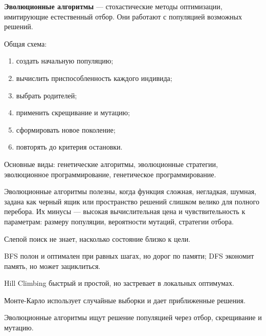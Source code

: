 \textbf{Эволюционные алгоритмы} --- стохастические методы оптимизации, имитирующие естественный отбор. Они работают с популяцией возможных решений.

Общая схема:
\begin{enumerate}
    \item создать начальную популяцию;
    \item вычислить приспособленность каждого индивида;
    \item выбрать родителей;
    \item применить скрещивание и мутацию;
    \item сформировать новое поколение;
    \item повторять до критерия остановки.
\end{enumerate}

Основные виды: генетические алгоритмы, эволюционные стратегии, эволюционное программирование, генетическое программирование.

Эволюционные алгоритмы полезны, когда функция сложная, негладкая, шумная, задана как черный ящик или пространство решений слишком велико для полного перебора. Их минусы --- высокая вычислительная цена и чувствительность к параметрам: размеру популяции, вероятности мутаций, стратегии отбора.

\begin{important}
    \item Слепой поиск не знает, насколько состояние близко к цели.
    \item BFS полон и оптимален при равных шагах, но дорог по памяти; DFS экономит память, но может зациклиться.
    \item Hill Climbing быстрый и простой, но застревает в локальных оптимумах.
    \item Монте-Карло использует случайные выборки и дает приближенные решения.
    \item Эволюционные алгоритмы ищут решение популяцией через отбор, скрещивание и мутацию.
\end{important}
